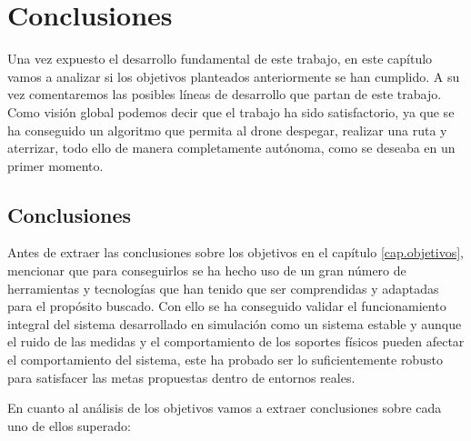 \chapter{Conclusiones}\label{cap.conclusiones}
\hspace{1cm} Una vez expuesto el desarrollo fundamental de este trabajo, en este capítulo vamos a analizar si los objetivos planteados anteriormente se han cumplido. A su vez comentaremos las posibles líneas de desarrollo que partan de este trabajo. Como visión global podemos decir que el trabajo ha sido satisfactorio, ya que se ha conseguido un algoritmo que permita al drone despegar, realizar una ruta y aterrizar, todo ello de manera completamente autónoma, como se deseaba en un primer momento. 

\section{Conclusiones}
\hspace{1cm} Antes de extraer las conclusiones sobre los objetivos en el capítulo \ref{cap.objetivos}, mencionar que para conseguirlos se ha hecho uso de un gran número de herramientas y tecnologías que han tenido que ser comprendidas y adaptadas para el propósito buscado. Con ello se ha conseguido validar el funcionamiento integral del sistema desarrollado en simulación como un sistema estable y aunque el ruido de las medidas y el comportamiento de los soportes físicos pueden afectar el comportamiento del sistema, este ha probado ser lo suficientemente robusto para satisfacer las metas propuestas dentro de entornos reales.

\hspace{1cm} En cuanto al análisis de los objetivos vamos a extraer conclusiones sobre cada uno de ellos superado:

